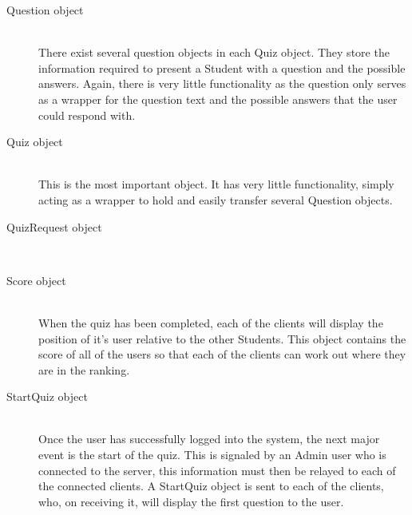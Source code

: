 \begin{description}
	\item[Question object]\hfill \\ There exist several question objects in
		each Quiz object. They store the information required to present a
		Student with a question and the possible answers. Again, there is very
		little functionality as the question only serves as a wrapper for the
		question text and the possible answers that the user could respond
		with.

	\item[Quiz object]\hfill \\ This is the most important object. It has very
		little functionality, simply acting as a wrapper to hold and easily
		transfer several Question objects.

	\item[QuizRequest object]\hfill \\

	\item[Score object]\hfill \\ When the quiz has been completed, each of the
		clients will display the position of it's user relative to the other
		Students. This object contains the score of all of the users so that
		each of the clients can work out where they are in the ranking.

	\item[StartQuiz object]\hfill \\ Once the user has successfully logged into
		the system, the next major event is the start of the quiz. This is
		signaled by an Admin user who is connected to the server, this
		information must then be relayed to each of the connected clients. A
		StartQuiz object is sent to each of the clients, who, on receiving it,
		will display the first question to the user.
\end{description}
